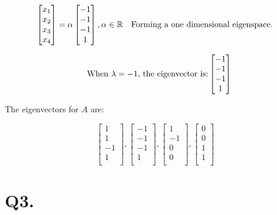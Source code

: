 \documentclass[12pt]{article}
\begin{document}
$$
\begin{bmatrix}
	x_1 \\
	x_2 \\
	x_3 \\
	x_4 \\
\end{bmatrix}
=
\alpha
\begin{bmatrix}
	-1 \\
	-1 \\
	-1 \\
	1 \\
\end{bmatrix},
\alpha \in \mathbb{R}
\hspace{10px}
\text{Forming a one dimensional eigenspace.}
$$

$$
\hspace{10px}
\text{When $\lambda=-1$, the eigenvector is:}
\begin{bmatrix}
	-1 \\
	-1 \\
	-1 \\
	1 \\
\end{bmatrix}
$$

The eigenvectors for $A$ are:

$$
\begin{bmatrix}
	1 \\
	1 \\
	-1 \\
	1 \\
\end{bmatrix}, \begin{bmatrix}
	-1 \\
	-1 \\
	-1 \\
	1 \\
\end{bmatrix}, \begin{bmatrix}
	1 \\
	-1 \\
	0 \\
	0 \\
\end{bmatrix}, \begin{bmatrix}
	0 \\
	0 \\
	1 \\
	1 \\
\end{bmatrix}
$$

\section*{Q3.}
\end{document}
